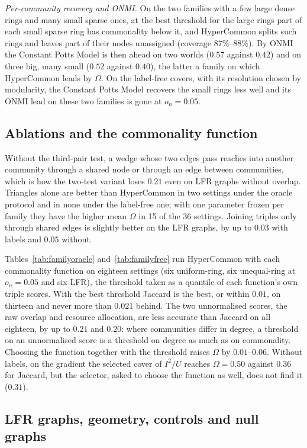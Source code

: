 \emph{Per-community recovery and ONMI.} On the two families with a few large dense
rings and many small sparse ones, at the best threshold for the large rings part of each
small sparse ring has commonality below it, and HyperCommon splits such rings and leaves
part of their nodes unassigned (coverage $87\%$--$88\%$). By ONMI the Constant Potts
Model is then ahead on two worlds ($0.57$ against $0.42$) and on three big, many small
($0.52$ against $0.40$), the latter a family on which HyperCommon leads by $\Omega$. On the label-free covers,
with its resolution chosen by modularity, the Constant Potts Model recovers the small
rings less well and its ONMI lead on these two families is gone at $o_n=0.05$.

\subsection*{Ablations and the commonality function}

Without the third-pair test, a wedge whose two edges pass reaches into another community
through a shared node or through an edge between communities, which is how the two-test
variant loses $0.21$ even on LFR graphs without overlap. Triangles alone are better than
HyperCommon in two settings under the oracle protocol and in none under the label-free
one; with one parameter frozen per family they have the higher mean $\Omega$ in 15 of
the 36 settings. Joining triples only through shared edges is slightly better on the LFR
graphs, by up to $0.03$ with labels and $0.05$ without.

Tables~\ref{tab:familyoracle} and~\ref{tab:familyfree} run HyperCommon with each
commonality function on eighteen settings (six uniform-ring, six unequal-ring at
$o_n=0.05$ and six LFR), the threshold taken as a quantile of each function's own triple
scores. With the best threshold Jaccard is the best, or within $0.01$, on thirteen and never more than $0.021$ behind. The two unnormalised scores, the raw overlap and resource
allocation, are less accurate than Jaccard on all eighteen, by up to $0.21$ and $0.20$:
where communities differ in degree, a threshold on an unnormalised score is a threshold
on degree as much as on commonality. Choosing the function together with the threshold
raises $\Omega$ by $0.01$--$0.06$. Without labels, on the gradient the selected cover of
$I^2/U$ reaches $\Omega=0.50$ against $0.36$ for Jaccard, but the selector, asked to
choose the function as well, does not find it ($0.31$).

\subsection*{LFR graphs, geometry, controls and null graphs}

